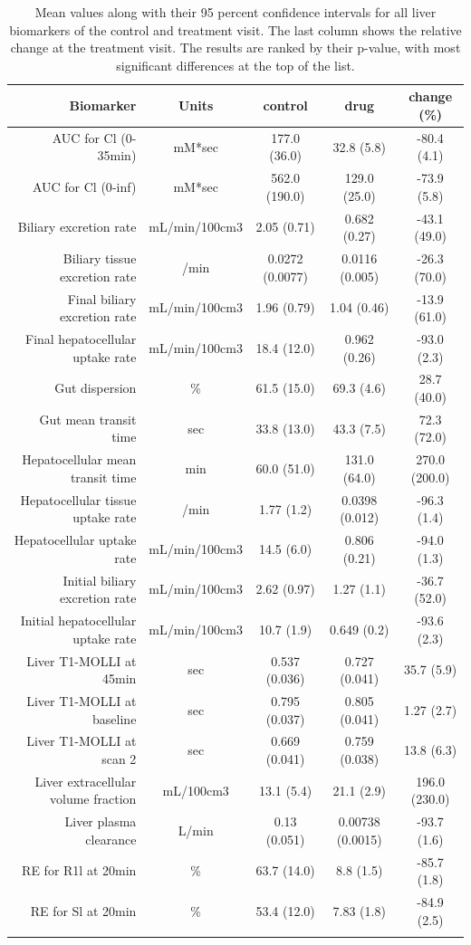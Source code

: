 \documentclass{epflreport}%
\begin{document}
\begin{longtable}{rcccc}%
\hline%
Biomarker&Units&control&drug&change (\%)\\%
\hline%
AUC for Cl (0{-}35min)&mM*sec&177.0 (36.0) &32.8 (5.8) &{-}80.4 (4.1) \\%
AUC for Cl (0{-}inf)&mM*sec&562.0 (190.0) &129.0 (25.0) &{-}73.9 (5.8) \\%
Biliary excretion rate&mL/min/100cm3&2.05 (0.71) &0.682 (0.27) &{-}43.1 (49.0) \\%
Biliary tissue excretion rate&/min&0.0272 (0.0077) &0.0116 (0.005) &{-}26.3 (70.0) \\%
Final biliary excretion rate&mL/min/100cm3&1.96 (0.79) &1.04 (0.46) &{-}13.9 (61.0) \\%
Final hepatocellular uptake rate&mL/min/100cm3&18.4 (12.0) &0.962 (0.26) &{-}93.0 (2.3) \\%
Gut dispersion&\%&61.5 (15.0) &69.3 (4.6) &28.7 (40.0) \\%
Gut mean transit time&sec&33.8 (13.0) &43.3 (7.5) &72.3 (72.0) \\%
Hepatocellular mean transit time&min&60.0 (51.0) &131.0 (64.0) &270.0 (200.0) \\%
Hepatocellular tissue uptake rate&/min&1.77 (1.2) &0.0398 (0.012) &{-}96.3 (1.4) \\%
Hepatocellular uptake rate&mL/min/100cm3&14.5 (6.0) &0.806 (0.21) &{-}94.0 (1.3) \\%
Initial biliary excretion rate&mL/min/100cm3&2.62 (0.97) &1.27 (1.1) &{-}36.7 (52.0) \\%
Initial hepatocellular uptake rate&mL/min/100cm3&10.7 (1.9) &0.649 (0.2) &{-}93.6 (2.3) \\%
Liver T1{-}MOLLI at 45min&sec&0.537 (0.036) &0.727 (0.041) &35.7 (5.9) \\%
Liver T1{-}MOLLI at baseline&sec&0.795 (0.037) &0.805 (0.041) &1.27 (2.7) \\%
Liver T1{-}MOLLI at scan 2&sec&0.669 (0.041) &0.759 (0.038) &13.8 (6.3) \\%
Liver extracellular volume fraction&mL/100cm3&13.1 (5.4) &21.1 (2.9) &196.0 (230.0) \\%
Liver plasma clearance&L/min&0.13 (0.051) &0.00738 (0.0015) &{-}93.7 (1.6) \\%
RE for R1l at 20min&\%&63.7 (14.0) &8.8 (1.5) &{-}85.7 (1.8) \\%
RE for Sl at 20min&\%&53.4 (12.0) &7.83 (1.8) &{-}84.9 (2.5) \\%
\hline%
\caption{Mean values along with their 95 percent confidence intervals for all liver biomarkers of the control and treatment visit. The last column shows the relative change at the treatment visit. The results are ranked by their p-value, with most significant differences at the top of the list.} \\%
\end{longtable}%
\clearpage%
\end{document}
